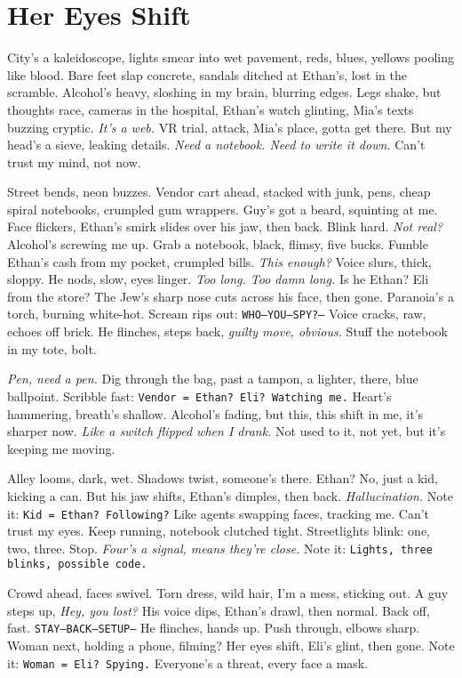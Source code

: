 \documentclass[12pt,oneside]{book}
\newcommand{\note}[1]{\texttt{#1}}
\begin{document}
\chapter{Her Eyes Shift}

City’s a kaleidoscope, lights smear into wet pavement, reds, blues, yellows pooling like blood. Bare feet slap concrete, sandals ditched at Ethan’s, lost in the scramble. Alcohol’s heavy, sloshing in my brain, blurring edges. Legs shake, but thoughts race, cameras in the hospital, Ethan’s watch glinting, Mia’s texts buzzing cryptic. \textit{It’s a web.} VR trial, attack, Mia’s place, gotta get there. But my head’s a sieve, leaking details. \textit{Need a notebook. Need to write it down.} Can’t trust my mind, not now.

Street bends, neon buzzes. Vendor cart ahead, stacked with junk, pens, cheap spiral notebooks, crumpled gum wrappers. Guy’s got a beard, squinting at me. Face flickers, Ethan’s smirk slides over his jaw, then back. Blink hard. \textit{Not real?} Alcohol’s screwing me up. Grab a notebook, black, flimsy, five bucks. Fumble Ethan’s cash from my pocket, crumpled bills. \textit{This enough?} Voice slurs, thick, sloppy. He nods, slow, eyes linger. \textit{Too long. Too damn long.} Is he Ethan? \textnormal{Eli} from the store? The Jew’s sharp nose cuts across his face, then gone. Paranoia’s a torch, burning white-hot. Scream rips out: \note{WHO—YOU—SPY?—} Voice cracks, raw, echoes off brick. He flinches, steps back, \textit{guilty move, obvious.} Stuff the notebook in my tote, bolt.

\textit{Pen, need a pen.} Dig through the bag, past a tampon, a lighter, there, blue ballpoint. Scribble fast: \note{Vendor = Ethan? Eli? Watching me.} Heart’s hammering, breath’s shallow. Alcohol’s fading, but this, this shift in me, it’s sharper now. \textit{Like a switch flipped when I drank.} Not used to it, not yet, but it’s keeping me moving.

Alley looms, dark, wet. Shadows twist, someone’s there. Ethan? No, just a kid, kicking a can. But his jaw shifts, Ethan’s dimples, then back. \textit{Hallucination.} Note it: \note{Kid = Ethan? Following?} Like agents swapping faces, tracking me. Can’t trust my eyes. Keep running, notebook clutched tight. Streetlights blink: one, two, three. Stop. \textit{Four’s a signal, means they’re close.} Note it: \note{Lights, three blinks, possible code.}

Crowd ahead, faces swivel. Torn dress, wild hair, I’m a mess, sticking out. A guy steps up, \textit{Hey, you lost?} His voice dips, Ethan’s drawl, then normal. Back off, fast. \note{STAY—BACK—SETUP—} He flinches, hands up. Push through, elbows sharp. Woman next, holding a phone, filming? Her eyes shift, \textnormal{Eli}’s glint, then gone. Note it: \note{Woman = Eli? Spying.} Everyone’s a threat, every face a mask.
\end{document}
